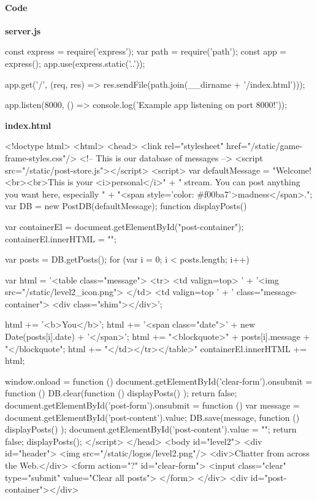 \begin{Exercise}[label={websec-xss-game}]
\paragraph{Code}
\textbf{server.js}
\begin{js}
const express = require('express');
var path = require('path');
const app = express();
app.use(express.static('..'));

app.get('/', (req, res) => res.sendFile(path.join(__dirname + '/index.html')));

app.listen(8000, () => console.log('Example app listening on port 8000!'));
\end{js}
\textbf{index.html}
\begin{html}
<!doctype html>
<html>
  <head>
    <link rel="stylesheet" href="/static/game-frame-styles.css"/>
    <!-- This is our database of messages -->
    <script src="/static/post-store.js"></script>
    <script>
    var defaultMessage = "Welcome!<br><br>This is your <i>personal</i>"
    + " stream. You can post anything you want here, especially "
    + "<span style='color: #f00ba7'>madness</span>.";
    var DB = new PostDB(defaultMessage);
    function displayPosts() {
        var containerEl = document.getElementById("post-container");
        containerEl.innerHTML = "";
    
        var posts = DB.getPosts();
        for (var i = 0; i < posts.length; i++) {
          var html = '<table class="message"> <tr> <td valign=top> '
          + '<img src="/static/level2_icon.png"> </td> <td valign=top '
          + ' class="message-container"> <div class="shim"></div>';
          
          html += '<b>You</b>';
          html += '<span class="date">' + new Date(posts[i].date) + '</span>';
          html += "<blockquote>" + posts[i].message + "</blockquote";
          html += "</td></tr></table>"
          containerEl.innerHTML += html;
        }
    }
    window.onload = function () {
      document.getElementById('clear-form').onsubmit = function () {
        DB.clear(function () {
          displayPosts()
         });
        return false;
      }
      document.getElementById('post-form').onsubmit = function () {
        var message = document.getElementById('post-content').value;
        DB.save(message, function () {
          displayPosts()
        });
        document.getElementById('post-content').value = "";
        return false;
      }
      displayPosts();
    }
    </script>
  </head>
  <body id="level2">
  <div id="header">
  <img src="/static/logos/level2.png"/>
  <div>Chatter from across the Web.</div>
  <form action="?" id="clear-form">
  <input class="clear" type="submit" value="Clear all posts">
  </form>
  </div>
  <div id="post-container"></div>
  

\end{html}
\end{Exercise}
